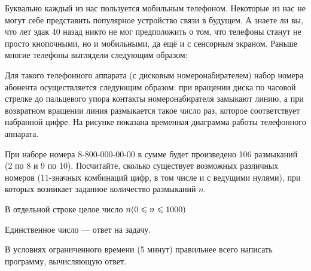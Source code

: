 
Буквально каждый из нас пользуется мобильным телефоном. Некоторые из нас не могут себе представить популярное устройство связи в будущем. А знаете ли вы, что лет эдак 40 назад никто не мог предположить о том, что телефоны станут не просто кнопочными, но и мобильными, да ещё и с сенсорным экраном. Раньше многие телефоны выглядели следующим образом:


Для такого телефонного аппарата (с дисковым номеронабирателем) набор номера абонента осуществляется следующим образом: при вращении диска по часовой стрелке до пальцевого упора контакты номеронабирателя замыкают линию, а при возвратном вращении линия размыкается такое число раз, которое соответствует набранной цифре. На рисунке показана временная диаграмма работы телефонного аппарата.


При наборе номера  8-800-000-00-00 в сумме будет произведено 106 размыканий (2 по 8 и 9 по 10). Посчитайте, сколько существует возможных различных номеров (11-значных комбинаций цифр, в том числе и с ведущими нулями), при которых возникает заданное количество размыканий $n$. 


В отдельной строке целое число $n\space(0 \leq n \leq 1000)$ 

\outputfmtSection

Единственное число — ответ на задачу.

\solutionSection

В условиях ограниченного времени (5 минут) правильнее всего написать программу, вычисляющую ответ. 

